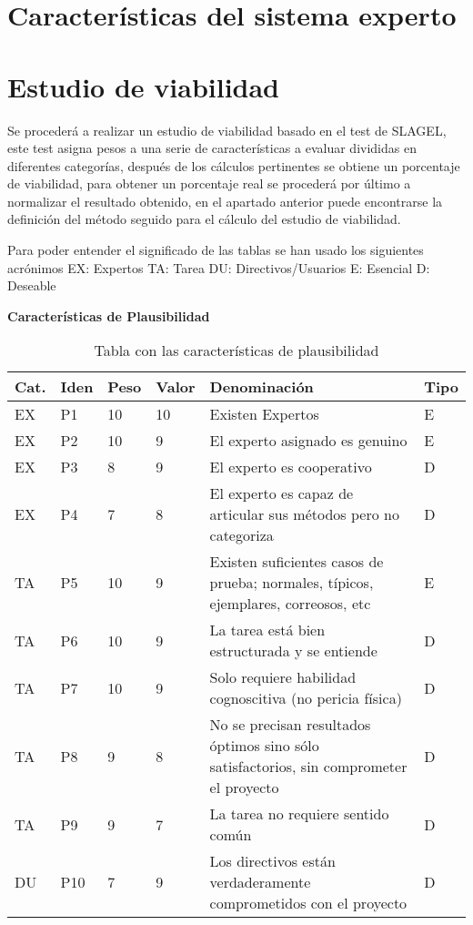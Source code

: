 \section{Características del sistema experto}



\section{Estudio de viabilidad}
Se procederá a realizar un estudio de viabilidad basado en el test de SLAGEL, este test
 asigna pesos a una serie de características a evaluar divididas en diferentes categorías,
 después de los cálculos pertinentes se obtiene un porcentaje de viabilidad, para obtener
 un porcentaje real se procederá por último a normalizar el resultado obtenido, en el apartado
 anterior puede encontrarse la definición del método seguido para el cálculo del estudio de
 viabilidad.

Para poder entender el significado de las tablas se han usado los siguientes acrónimos
 EX: Expertos TA: Tarea DU: Directivos/Usuarios E: Esencial D: Deseable

\textbf{Características de Plausibilidad}

\begin{table}[htb]%
  \centering
  \caption{Tabla con las características de plausibilidad}
  \label{tab:anchura}
  \begin{tabular}{ | l | l | l | l | p{8cm} | l | }
    \hline
    Cat. & Iden & Peso & Valor & Denominación & Tipo \\ \hline
    EX & P1 & 10 & 10 & Existen Expertos & E \\ \hline
    EX & P2 &  10 & 9 & El experto asignado es genuino & E \\ \hline
    EX & P3 & 8 & 9 & El experto es cooperativo & D \\ \hline
    EX & P4 & 7 & 8 & El experto es capaz de articular sus métodos pero no categoriza & D \\ \hline
    TA & P5 & 10 & 9 & Existen suficientes casos de prueba; normales, típicos, ejemplares, correosos, etc & E \\ \hline
    TA & P6 & 10 & 9 & La tarea está bien estructurada y se entiende & D \\ \hline
    TA & P7 & 10 & 9 & Solo requiere habilidad cognoscitiva (no pericia física) & D \\ \hline
    TA & P8 & 9 & 8 & No se precisan resultados óptimos sino sólo satisfactorios, sin comprometer el proyecto & D \\ \hline
    TA & P9 & 9 & 7 & La tarea no requiere sentido común & D \\ \hline
    DU & P10 & 7 & 9 & Los directivos están verdaderamente comprometidos con el proyecto & D \\ \hline
  \end{tabular}
\end{table}

